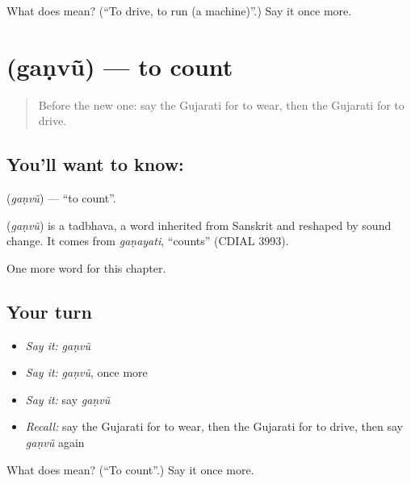 \begin{tcolorbox}[breakable,colback=teal!4,colframe=teal!35!black,title={Before you move on}]
What does  mean? (\textquotedblleft{}To drive, to run (a machine)\textquotedblright{}.) Say it once more.
\end{tcolorbox}
\section[\texorpdfstring{\gu{ગણવું} (gaṇvũ)}{ગણવું (gaṇvũ)}]{ (gaṇvũ) — to count}

\label{lesson:GU-C141-ganvu}



\begin{quote}
Before the new one: say the Gujarati for to wear, then the Gujarati for to drive.
\end{quote}

\subsection*{You'll want to know: }
\textbf{} (\emph{gaṇvũ}) — \textquotedblleft{}to count\textquotedblright{}.

\begin{cousinweb}
\textbf{} (\emph{gaṇvũ}) is a tadbhava, a word inherited from Sanskrit and reshaped by sound change. It comes from \emph{gaṇayati}, \textquotedblleft{}counts\textquotedblright{} (CDIAL 3993).
\end{cousinweb}

\begin{grammarlens}[title={What you've built}]
One more word for this chapter.
\end{grammarlens}

\subsection*{Your turn}
\begin{itemize}
\raggedright
  \item \emph{Say it:} \emph{gaṇvũ}
  \item \emph{Say it:} \emph{gaṇvũ}, once more
  \item \emph{Say it:} say \emph{gaṇvũ}
  \item \emph{Recall:} say the Gujarati for to wear, then the Gujarati for to drive, then say \emph{gaṇvũ} again
\end{itemize}

\begin{tcolorbox}[breakable,colback=teal!4,colframe=teal!35!black,title={Before you move on}]
What does  mean? (\textquotedblleft{}To count\textquotedblright{}.) Say it once more.
\end{tcolorbox}
